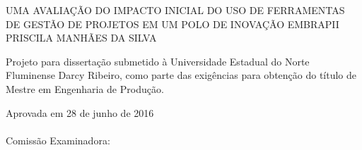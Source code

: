 \begin{folhadeaprovacao}
    \setlength{\ABNTsignthickness}{0.4pt}
    \setlength{\ABNTsignwidth}{15cm}
    \setlength{\ABNTsignskip}{0.9cm}
    \begin{center}
       {\large UMA AVALIAÇÃO DO IMPACTO INICIAL DO USO DE FERRAMENTAS DE GESTÃO DE PROJETOS EM UM POLO DE INOVAÇÃO EMBRAPII} \\ [3.5cm]
       {\large PRISCILA MANHÃES DA SILVA} \\ [1.5cm]
        \hspace{.45\textwidth} %
        \begin{minipage}{0.5\textwidth}
        \begin{espacosimples}
        Projeto para dissertação submetido à Universidade Estadual do Norte Fluminense Darcy Ribeiro, como parte das exigências para obtenção do título de Mestre em Engenharia de Produção.
        \end{espacosimples}
        \end{minipage}
    \end{center}
    {\normalsize Aprovada em 28 de junho de 2016} \\\\
    {\normalsize Comissão Examinadora: }
    \bigbreak
    \bigbreak
    \bigbreak
\end{folhadeaprovacao}
